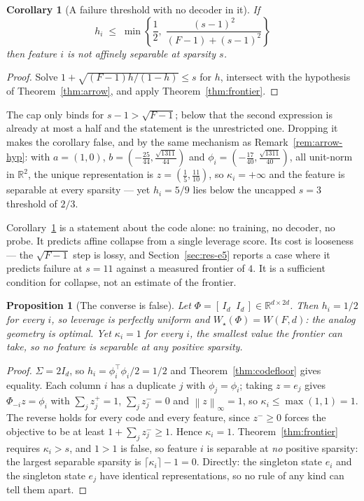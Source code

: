 \documentclass[preprint,12pt]{elsarticle}
\newtheorem{proposition}[theorem]{Proposition}
\newtheorem{corollary}[theorem]{Corollary}
\theoremstyle{definition}
\newcommand{\R}{\mathbb{R}}
\newcommand{\norm}[1]{\left\lVert #1 \right\rVert}
\begin{document}
\begin{corollary}[A failure threshold with no decoder in it]
\label{cor:failthresh}
If
\[
  h_i\;\le\;\min\left\{\frac12,\;\frac{(s-1)^2}{(F-1)+(s-1)^2}\right\}
\]
then feature $i$ is \emph{not} affinely separable at sparsity $s$.
\end{corollary}

\begin{proof}
Solve $1+\sqrt{(F-1)h/(1-h)}\le s$ for $h$, intersect with the hypothesis of
Theorem~\ref{thm:arrow}, and apply Theorem~\ref{thm:frontier}.
\end{proof}

The cap only binds for $s-1>\sqrt{F-1}$; below that the second expression is already at most a
half and the statement is the unrestricted one. Dropping it makes the corollary false, and by the
same mechanism as Remark~\ref{rem:arrow-hyp}: with $a=(1,0)$,
$b=(-\tfrac{25}{44},\tfrac{\sqrt{1311}}{44})$ and
$\phi_i=(-\tfrac{17}{40},\tfrac{\sqrt{1311}}{40})$, all unit-norm in $\R^2$, the unique
representation is $z=(\tfrac15,\tfrac{11}{10})$, so $\kappa_i=+\infty$ and the feature is separable
at every sparsity --- yet $h_i=5/9$ lies below the uncapped $s=3$ threshold of $2/3$.

Corollary~\ref{cor:failthresh} is a statement about the code alone: no training, no decoder, no
probe. It predicts affine collapse from a single leverage score. Its cost is looseness --- the
$\sqrt{F-1}$ step is lossy, and Section~\ref{sec:res-e5} reports a case where it predicts
failure at $s=11$ against a measured frontier of $4$. It is a sufficient condition for collapse,
not an estimate of the frontier.

\begin{proposition}[The converse is false]
\label{prop:oneway}
Let $\Phi=[\,I_d\;\;I_d\,]\in\R^{d\times2d}$. Then $h_i=1/2$ for every $i$, so leverage is
perfectly uniform and $W_{\star}(\Phi)=W(F,d)$: the analog geometry is optimal. Yet
$\kappa_i=1$ for every $i$, the smallest value the frontier can take, so no feature is separable at
any positive sparsity.
\end{proposition}

\begin{proof}
$\Sigma=2I_d$, so $h_i=\phi_i^{\top}\phi_i/2=1/2$ and Theorem~\ref{thm:codefloor} gives equality.
Each column $i$ has a duplicate $j$ with $\phi_j=\phi_i$; taking $z=e_j$ gives
$\Phi_{-i}z=\phi_i$ with $\sum_jz^{+}_j=1$, $\sum_jz^{-}_j=0$ and $\norm{z}_\infty=1$, so
$\kappa_i\le\max(1,1)=1$. The reverse holds for every code and every feature, since
$z^{-}\ge0$ forces the objective to be at least $1+\sum_jz^{-}_j\ge1$. Hence $\kappa_i=1$.
Theorem~\ref{thm:frontier} requires $\kappa_i>s$, and $1>1$ is false, so feature $i$ is separable
at \emph{no} positive sparsity: the largest separable sparsity is $\lceil\kappa_i\rceil-1=0$.
Directly: the singleton state $e_i$ and the singleton state $e_j$ have identical representations,
so no rule of any kind can tell them apart.
\end{proof}
\end{document}
